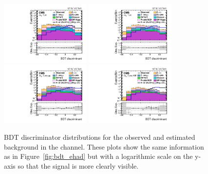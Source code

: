 \begin{figure}[htbp!]
  \centering
  \includegraphics[width=0.4\textwidth]{plots/chapter9/BDT/etau/log_0jet.pdf}
  \includegraphics[width=0.4\textwidth]{plots/chapter9/BDT/etau/log_1jet.pdf} \\
  \includegraphics[width=0.4\textwidth]{plots/chapter9/BDT/etau/log_2jet_gg.pdf}
  \includegraphics[width=0.4\textwidth]{plots/chapter9/BDT/etau/log_2jet_vbf.pdf} \\
  \caption{BDT discriminator distributions for the observed and estimated background in the \ehad channel. These plots show the same information as in Figure~\ref{fig:bdt_ehad} but with a logarithmic scale on the y-axis so that the signal is more clearly visible.}
  \label{fig:bdt_ehad_log}
\end{figure}


